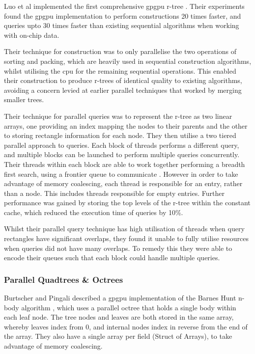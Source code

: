       Luo et al implemented the first comprehensive \gls{gpgpu} r-tree \cite{LWL12}. Their experiments found the \gls{gpgpu} implementation to perform constructions 20 times faster, and queries upto 30 times faster than existing sequential algorithms when working with \gls{on-chip} data.
      
      Their technique for construction was to only parallelise the two operations of sorting and packing, which are heavily used in sequential construction algorithms, whilst utilising the \gls{cpu} for the remaining sequential operations. This enabled their construction to produce r-trees of identical quality to existing algorithms, avoiding a concern levied at earlier parallel techniques that worked by merging smaller trees.
      
      Their technique for parallel queries was to represent the r-tree as two linear arrays, one providing an index mapping the nodes to their parents and the other to storing rectangle information for each node. They then utilise a two tiered parallel approach to queries. Each block of threads performs a different query, and multiple blocks can be launched to perform multiple queries concurrently. Their threads within each block are able to work together performing a breadth first search, using a frontier queue to communicate \cite{LWH10}. However in order to take advantage of memory coalescing, each thread is responsible for an entry, rather than a node. This includes threads responsible for empty entries. Further performance was gained by storing the top levels of the r-tree within the constant cache, which reduced the execution time of queries by 10\%.
      
      Whilst their parallel query technique has high utilisation of threads when query rectangles have significant overlaps, they found it unable to fully utilise resources when queries did not have many overlaps. To remedy this they were able to encode their queues such that each block could handle multiple queries.

    \subsubsection*{Parallel Quadtrees \& Octrees}
      Burtscher and Pingali described a \gls{gpgpu} implementation of the Barnes Hunt n-body algorithm \cite{BP11}, which uses a parallel octree that holds a single body within each leaf node. The tree nodes and leaves are both stored in the same array, whereby leaves index from 0, and internal nodes index in reverse from the end of the array. They also have a single array per field (Struct of Arrays), to take advantage of memory coalescing.
      
